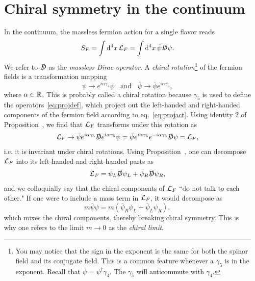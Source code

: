 %
%

\section{Chiral symmetry in the continuum}\label{sec:cscont}

In the continuum, the massless fermion action for a single flavor reads
\begin{equation}
S_F=\int\dd[4]{x}\mathcal{L}_F=\int\dd[4]{x}\bar{\psi}\slashed{D}\psi. 
\end{equation}
We refer to $\slashed{D}$ as the {\it massless Dirac operator}. A 
{\it chiral rotation}\footnote{You may notice that the sign in the exponent
is the same for both the spinor field and its conjugate field. This is a
common feature whenever a $\gamma_5$ is in the exponent. Recall that
$\bar{\psi}=\psi^\dagger\gamma_4$. The $\gamma_5$ will anticommute with 
$\gamma_4$.} of the fermion fields is a transformation
mapping
\begin{equation}
  \psi\to e^{i\alpha\gamma_5}\psi~~~~\text{and}~~~~
  \bar{\psi}\to\bar\psi e^{i\alpha\gamma_5},
\end{equation}
where $\alpha\in\mathbb{R}$. This is probably called a chiral rotation
because $\gamma_5$ is used to define the operators~\eqref{eq:projdef},
which project out the left-handed and right-handed components of the
fermion field according to eq.~\eqref{eq:projact}. Using identity 2 of
Proposition~, we find that $\mathcal{L}_F$ transforms under this
rotation as
\begin{equation}
  \mathcal{L}_F\to\bar{\psi}e^{i\alpha\gamma_5}\slashed{D}e^{i\alpha\gamma_5}\psi
         =\bar{\psi}e^{i\alpha\gamma_5}e^{-i\alpha\gamma_5}\slashed{D}\psi
         =\mathcal{L}_F,
\end{equation}
i.e. it is invariant under chiral rotations. Using
Proposition~, one can decompose $\mathcal{L}_F$ into its
left-handed and right-handed parts as
\begin{equation}
  \mathcal{L}_F=\bar{\psi}_L\slashed{D}\psi_L
         +\bar{\psi}_R\slashed{D}\psi_R,
\end{equation}
and we colloquially say that the chiral components of
$\mathcal{L}_F$ ``do not talk to each other."
If one were to include a mass term in $\mathcal{L}_F$, it would decompose as
\begin{equation}
  m\bar{\psi}\psi=m\left(\bar{\psi}_R\psi_L+\bar{\psi}_L\psi_R\right),
\end{equation}
which mixes the chiral components, thereby breaking chiral symmetry.
This is why one refers to the limit $m\to0$ as the {\it chiral limit}.

